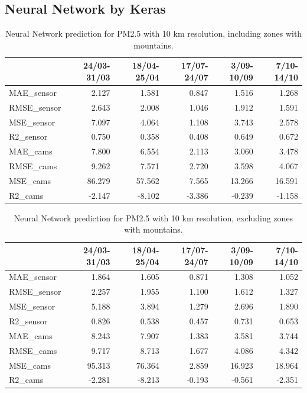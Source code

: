 \subsection{Neural Network by Keras}
\begin{table}[H]
\begin{tabular}{lrrrrr}
\toprule
 &  24/03-31/03 &  18/04-25/04 &  17/07-24/07 &  3/09-10/09 &  7/10-14/10 \\
\midrule
 MAE\_sensor &        2.127 &        1.581 &        0.847 &       1.516 &       1.268 \\
RMSE\_sensor &        2.643 &        2.008 &        1.046 &       1.912 &       1.591 \\
 MSE\_sensor &        7.097 &        4.064 &        1.108 &       3.743 &       2.578 \\
  R2\_sensor &        0.750 &        0.358 &        0.408 &       0.649 &       0.672 \\
   MAE\_cams &        7.800 &        6.554 &        2.113 &       3.060 &       3.478 \\
  RMSE\_cams &        9.262 &        7.571 &        2.720 &       3.598 &       4.067 \\
   MSE\_cams &       86.279 &       57.562 &        7.565 &      13.266 &      16.591 \\
    R2\_cams &       -2.147 &       -8.102 &       -3.386 &      -0.239 &      -1.158 \\
\bottomrule
\end{tabular}
\caption{Neural Network prediction for PM2.5 with 10 km resolution, including zones with mountains.}
\end{table}
\begin{table}[H]
\begin{tabular}{lrrrrr}
\toprule
 &  24/03-31/03 &  18/04-25/04 &  17/07-24/07 &  3/09-10/09 &  7/10-14/10 \\
\midrule
 MAE\_sensor &        1.864 &        1.605 &        0.871 &       1.308 &       1.052 \\
RMSE\_sensor &        2.257 &        1.955 &        1.100 &       1.612 &       1.327 \\
 MSE\_sensor &        5.188 &        3.894 &        1.279 &       2.696 &       1.890 \\
  R2\_sensor &        0.826 &        0.538 &        0.457 &       0.731 &       0.653 \\
   MAE\_cams &        8.243 &        7.907 &        1.383 &       3.581 &       3.744 \\
  RMSE\_cams &        9.717 &        8.713 &        1.677 &       4.086 &       4.342 \\
   MSE\_cams &       95.313 &       76.364 &        2.859 &      16.923 &      18.964 \\
    R2\_cams &       -2.281 &       -8.213 &       -0.193 &      -0.561 &      -2.351 \\
\bottomrule
\end{tabular}
\caption{Neural Network prediction for PM2.5 with 10 km resolution, excluding zones with mountains.}
\end{table}
